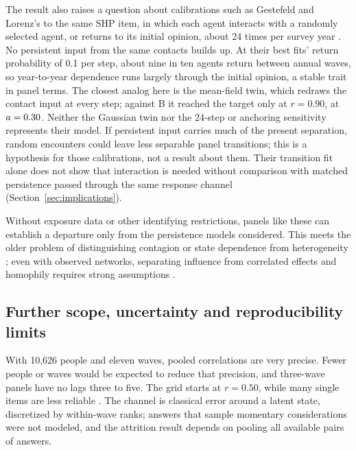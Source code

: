 The result also raises a question about calibrations such as Gestefeld and Lorenz's to the same SHP item, in which each agent interacts with a randomly selected agent, or returns to its initial opinion, about 24 times per survey year \cite{gestefeld2023}. No persistent input from the same contacts builds up. At their best fits' return probability of 0.1 per step, about nine in ten agents return between annual waves, so year-to-year dependence runs largely through the initial opinion, a stable trait in panel terms. The closest analog here is the mean-field twin, which redraws the contact input at every step; against B it reached the target only at $r=0.90$, at $a=\resultnum{j.x1b.r090.first.point}{0.30}$. Neither the Gaussian twin nor the 24-step or anchoring sensitivity represents their model. If persistent input carries much of the present separation, random encounters could leave less separable panel transitions; this is a hypothesis for those calibrations, not a result about them. Their transition fit alone does not show that interaction is needed without comparison with matched persistence passed through the same response channel (Section~\ref{sec:implications}).

Without exposure data or other identifying restrictions, panels like these can establish a departure only from the persistence models considered. This meets the older problem of distinguishing contagion or state dependence from heterogeneity \cite{feller1943,heckman1981,gelastopoulos2025}; even with observed networks, separating influence from correlated effects and homophily requires strong assumptions \cite{manski1993,shalizi2011}.

\subsection{Further scope, uncertainty and reproducibility limits}\label{sec:limitations}

With 10,626 people and eleven waves, pooled correlations are very precise. Fewer people or waves would be expected to reduce that precision, and three-wave panels have no lags three to five. The grid starts at $r=0.50$, while many single items are less reliable \cite{hout2016,ansolabehere2008}. The channel is classical error around a latent state, discretized by within-wave ranks; answers that sample momentary considerations \cite{zaller1992} were not modeled, and the attrition result depends on pooling all available pairs of answers.

